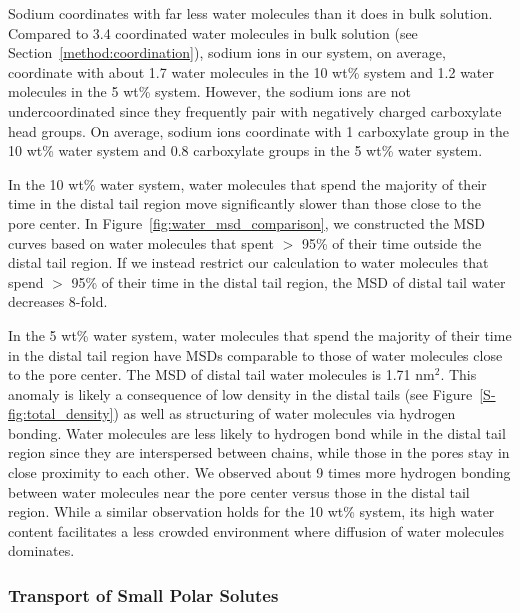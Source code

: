 \documentclass[journal=jpcbfk,manuscript=article]{achemso}
\begin{document}
  Sodium coordinates with far less water molecules than it does in bulk solution.
  Compared to 3.4 coordinated water molecules in bulk solution (see 
  Section~\ref{method:coordination}), sodium ions in our system, on average,
  coordinate with about 1.7 water molecules in the 10 wt\% system and 1.2 water
  molecules in the 5 wt\% system. However, the sodium ions are not undercoordinated
  since they frequently pair with negatively charged carboxylate head groups.
  On average, sodium ions coordinate with 1 carboxylate group in the 10 wt\% water
  system and 0.8 carboxylate groups in the 5 wt\% water system.
  
  In the 10 wt\% water system, water molecules that spend the majority of 
  their time in the distal tail region move significantly slower than those
  close to the pore center. In Figure~\ref{fig:water_msd_comparison}, we 
  constructed the MSD curves based on water molecules that spent $>$ 95\% of their
  time outside the distal tail region. If we instead restrict our calculation to
  water molecules that spend $>$ 95\% of their time in the distal tail region, 
  the MSD of distal tail water decreases 8-fold. 
  
  In the 5 wt\% water system, water molecules that spend the majority of their 
  time in the distal tail region have MSDs comparable to those of water molecules
  close to the pore center. The MSD of distal tail water molecules is 1.71 nm$^2$.
  This anomaly is likely a consequence of low density in the distal tails (see
  Figure~\ref{S-fig:total_density}) as well as structuring of water molecules via
  hydrogen bonding. Water molecules are less likely to hydrogen bond while in the
  distal tail region since they are interspersed between chains, while those in 
  the pores stay in close proximity to each other. We observed about 9 times more  %
  hydrogen bonding between water molecules near the pore center versus those in 
  the distal tail region. While a similar observation holds for the 10 wt\% system,
  its high water content facilitates a less crowded environment where diffusion
  of water molecules dominates.  
   
  \subsubsection{Transport of Small Polar Solutes}\label{section:general_transport_solutes}  
  
\end{document}
